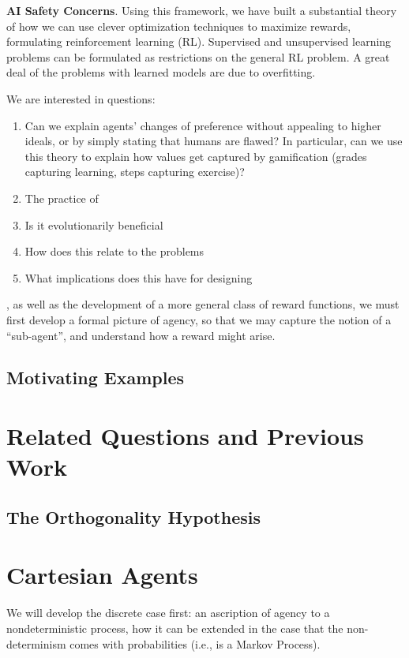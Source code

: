 \documentclass{article}
\theoremstyle{definition}
\begin{document}
	\textbf{AI Safety Concerns}. Using this framework, we have built a substantial theory of how we can use clever optimization techniques to maximize rewards, formulating reinforcement learning (RL). Supervised and unsupervised learning problems can be formulated as restrictions on the general RL problem. A great deal of the problems with learned models are due to overfitting.
	
	
	We are interested in questions:
	\begin{enumerate}
		\item Can we explain agents' changes of preference without appealing to higher ideals, or by simply stating that humans are flawed? In particular, can we use this theory to explain how values get captured by gamification (grades capturing learning, steps capturing exercise)? 
		\item The practice of 
		\item Is it evolutionarily beneficial 
		\item How does this relate to the problems 
		\item What implications does this have for designing
	\end{enumerate}
	
	
	
	, as well as the development of a more general class of reward functions, we must first develop a formal picture of agency, so that we may capture the notion of a ``sub-agent'', and understand how a reward might arise.
	
	\subsection{Motivating Examples}
	
	\section{Related Questions and Previous Work}
	\subsection{The Orthogonality Hypothesis}
	
	
	\section{Cartesian Agents}
	We will develop the discrete case first: an ascription of agency to a nondeterministic process, how it can be extended in the case that the non-determinism comes with probabilities (i.e., is a Markov Process).
	
\end{document}
